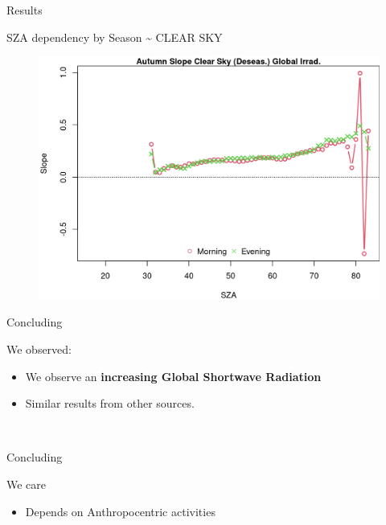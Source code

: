 \documentclass[
  ignorenonframetext,
]{beamer}
\providecommand{\tightlist}{%
  \setlength{\itemsep}{0pt}\setlength{\parskip}{0pt}}\usepackage{longtable,booktabs,array}
\begin{document}
\begin{frame}{Results}
\begin{block}{SZA dependency by Season \textasciitilde{} CLEAR SKY}
\begin{figure}
\begin{minipage}[t]{0.50\linewidth}
{\centering 

\includegraphics[width=4.48in,height=\textheight]{images/DHI_GHI_2_sza_trends_files/figure-html/szatrendsseas-111.png}

}

\end{minipage}%

\end{figure}
\end{block}

\begin{block}{Concluding}
\protect\hypertarget{concluding}{}
\begin{block}{We observed:}
\protect\hypertarget{we-observed}{}
\begin{itemize}
\tightlist
\item
  We observe an \textbf{increasing Global Shortwave Radiation}

\item
  Similar results from other sources.
\end{itemize}

~ ~
\end{block}
\end{block}

\begin{block}{Concluding}
\protect\hypertarget{concluding-1}{}
\begin{block}{We care}
\protect\hypertarget{we-care}{}
\begin{itemize}
\tightlist
\item
  Depends on Anthropocentric activities


\end{itemize}
\end{block}
\end{block}
\end{frame}
\end{document}
